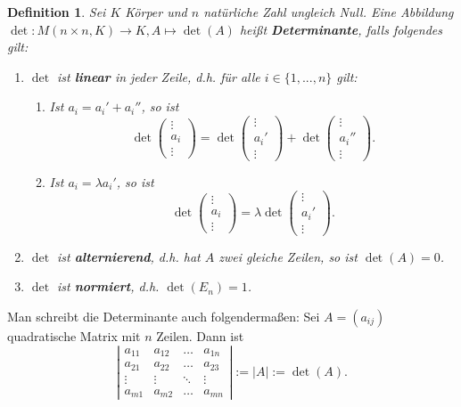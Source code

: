 \documentclass[12pt,a4paper]{article}
\theoremstyle{plain}
\newtheorem{Definition}[Theorem]{Definition}
\newcommand{\herv}[1]{{\emph{\textbf{#1}}}}
\numberwithin{equation}{section}
\begin{document}
\begin{Definition}
Sei $K$ Körper und $n$ natürliche Zahl ungleich Null. Eine Abbildung
$\operatorname{det}\colon M(n\times n,K)\rightarrow K, A\mapsto \operatorname{det} (A)$
heißt \herv{Determinante}, falls folgendes gilt:
\begin{enumerate}
\renewcommand{\labelenumi}{\emph{\underline{D\arabic{enumi}}}}
\item $\operatorname{det}$ ist \herv{linear} in jeder Zeile, d.h. für alle $i\in\{1,...,n\}$ gilt:\begin{enumerate}
\renewcommand{\labelenumi}{\emph{(\alph{enumi})}}
\item  Ist $a_i=a_i'+a_i''$, so ist
\[\operatorname{det}\begin{pmatrix} \vdots\\ a_i\\\vdots\end{pmatrix}=\operatorname{det}\begin{pmatrix} \vdots\\ a_i'\\\vdots\end{pmatrix}+\operatorname{det}\begin{pmatrix} \vdots\\ a_i''\\\vdots\end{pmatrix}.\]
\item  Ist $a_i=\lambda a_i'$, so ist
\[\operatorname{det}\begin{pmatrix} \vdots\\ a_i\\\vdots\end{pmatrix}=\lambda\operatorname{det}\begin{pmatrix} \vdots\\ a_i'\\\vdots\end{pmatrix}.\]
\end{enumerate}
\item $\operatorname{det}$ ist \herv{alternierend}, d.h. hat $A$ zwei gleiche Zeilen, so ist $\operatorname{det} (A)=0$.
\item $\operatorname{det}$ ist \herv{normiert}, d.h. $\operatorname{det} (E_n)=1$.
\end{enumerate}
\end{Definition}
Man schreibt die Determinante auch folgendermaßen: Sei $A=(a_{ij})$ quadratische Matrix mit $n$ Zeilen. Dann ist
\[\left\lvert\begin{matrix}a_{11}&a_{12}& \ldots &a_{1n}\\ a_{21}&a_{22}&\ldots &a_{23}\\
\vdots & \vdots & \ddots & \vdots \\a_{m1}&a_{m2}&\ldots & a_{mn}\end{matrix}\right\rvert :=\lvert A\rvert :=\det(A).\]
\end{document}

